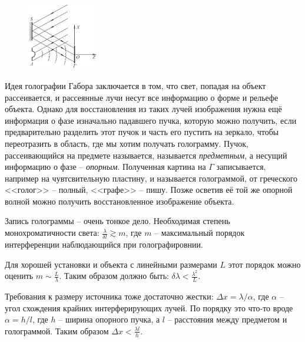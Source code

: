 
\begin{figure}
  \begin{center}
    \includegraphics[width=0.28\textwidth]{figures/s54_1.png}
  \end{center}
\end{figure}
Идея голографии Габора заключается в том, что свет, попадая на объект рассеивается, и рассеянные лучи несут все информацию о форме и рельефе объекта. Однако для восстановления из таких лучей изображения нужна ещё информация о фазе изначально падавшего пучка, которую можно получить, если предварительно разделить этот пучок и часть его пустить на зеркало, чтобы переотразить в область, где мы хотим получать голограмму.
Пучок, рассеивающийся на предмете называется, называется \textit{предметным}, а несущий информацию о фазе -- \textit{опорным}.
Полученная картина на $\Gamma$ записывается, например на чувтсвительную пластину,  и называется голограммой, от греческого <<голог>> -- полный, <<графе>> -- пишу. Позже осветив её той же опорной волной можно получить восстановленное изображение объекта.

Запись голограммы -- очень тонкое дело. Необходимая степень монохроматичности света:
	$\boxed{\frac{\lambda}{\delta l} \gtrsim m}$,
	где $m$ -- максимальный порядок интерференции наблюдающийся при голографировнии.

Для хорошей установки и объекта с линейными размерами $L $ этот порядок можно оценить $\boxed{m \sim \frac{L}{\lambda}}$.
Таким образом должно быть: $\boxed{\delta\lambda < \frac{\lambda^2}{L}}$.

Требования к размеру источника тоже достаточно жестки: $\Delta x = \lambda/\alpha$, где $\alpha$ -- угол схождения крайних интерферирующих лучей. По порядку это что-то вроде $\alpha = h/l$, где $h$ -- ширина опорного пучка, а $l$ -- расстояния между предметом и голограммой. Таким образом $\boxed{\Delta x < \frac{\lambda l}{h}}$.

